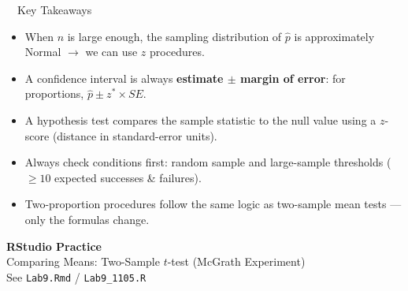 \documentclass[aspectratio=169,11pt]{beamer}
\begin{document}
\begin{frame}{\ \ Key Takeaways}
  \begin{keybox}
    \begin{itemize}
      \item When $n$ is large enough, the sampling distribution of $\hat{p}$ is approximately Normal $\rightarrow$ we can use $z$ procedures.
      \item A confidence interval is always \textbf{estimate $\pm$ margin of error}: for proportions, $\hat{p} \pm z^{*} \times SE$.
      \item A hypothesis test compares the sample statistic to the null value using a $z$-score (distance in standard-error units).
      \item Always check conditions first: random sample and large-sample thresholds ($\ge 10$ expected successes \& failures).
      \item Two-proportion procedures follow the same logic as two-sample mean tests --- only the formulas change.
    \end{itemize}
  \end{keybox}
\end{frame}

{
\begin{frame}
  \vfill
  \centering
  {\color{qrnavy}\Huge\bfseries RStudio Practice}\\[0.8em]
  {\color{qrblue}\large Comparing Means: Two-Sample $t$-test (McGrath Experiment)}\\[0.4em]
  {\color{qrgray} See \texttt{Lab9.Rmd} / \texttt{Lab9\_1105.R}}
  \vfill
\end{frame}
}
\end{document}
